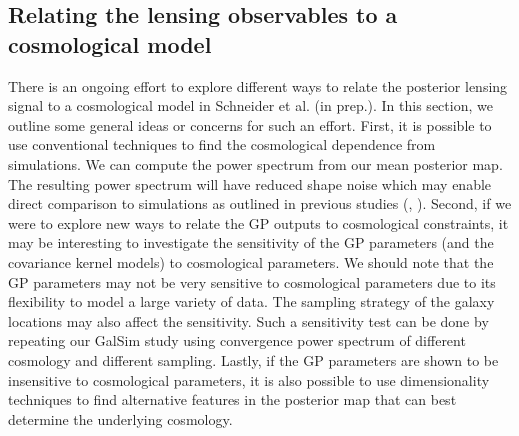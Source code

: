 \subsection{Relating the lensing observables to a cosmological model}
There is an ongoing effort to explore different ways to relate the posterior lensing signal 
to a cosmological model in Schneider et al. (in prep.). In this section, we outline some general
ideas or concerns for such an effort. First, it is possible to use conventional techniques 
 to find the cosmological dependence from simulations.  
We can compute the power spectrum from our mean posterior map. The resulting
power spectrum will have reduced shape noise which may enable direct comparison to
simulations as outlined in previous studies (\citealt{Jee2013a},
\citealt{Semboloni2007}). 
Second, if we were to explore new ways to relate the GP outputs to cosmological constraints,  
it may be interesting to investigate the sensitivity of the GP parameters (and
the covariance kernel models) to cosmological parameters. 
We should note that the GP parameters may not be very sensitive to cosmological parameters
due to its flexibility to model a large variety of data. The sampling strategy of
the galaxy locations may also affect the sensitivity. Such a sensitivity test can be
done by repeating our {\sc GalSim} study using convergence power spectrum of different cosmology 
and different sampling. Lastly, if the GP parameters are shown to be
insensitive to cosmological parameters, it is also possible to use dimensionality
techniques to find alternative features in the posterior map that can best determine the
underlying cosmology. 


